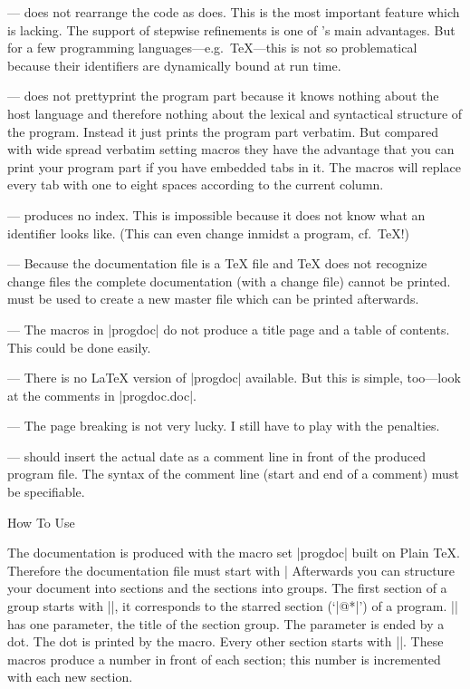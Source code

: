 \item{---} \MAKEPROG{} does not rearrange the code as \TANGLE{} does.
This is the most important feature which is lacking.  The support of
stepwise refinements is one of \WEB{}'s main advantages.  But for a
few programming languages---e.g.\ \TeX{}---this is not so problematical
because their identifiers are dynamically bound at run time.

\item{---} \MAKEPROG{} does not prettyprint the program part because
it knows nothing about the host language and therefore nothing about
the lexical and syntactical structure of the program.  Instead it just
prints the program part verbatim.  But compared with wide spread
verbatim setting macros they have the advantage that you can print
your program part if you have embedded tabs in it.  The macros will
replace every tab with one to eight spaces according to the current
column.

\item{---} \MAKEPROG{} produces no index.  This is impossible because
it does not know what an identifier looks like.  (This can even change
inmidst a program, cf.\ \TeX!)

\item{---} Because the documentation file is a \TeX{} file and \TeX{}
does not recognize change files the complete documentation (with a
change file) cannot be printed.  \TIE{} must be used to create a new
master file which can be printed afterwards.

\item{---} The macros in |progdoc| do not produce a title page and a
table of contents.  This could be done easily.

\item{---} There is no \LaTeX{} version of |progdoc| available.  But
this is simple, too---look at the comments in |progdoc.doc|.

\item{---} The page breaking is not very lucky.  I still have to play
with the penalties.

\item{---} \MAKEPROG{} should insert the actual date as a comment line
in front of the produced program file. The syntax of the comment line
(start and end of a comment) must be specifiable.




\beginsection How To Use \MAKEPROG{}

The documentation is produced with the macro set |progdoc| built on
Plain \TeX{}.  Therefore the documentation file must start with
|  Afterwards you can structure your document into
sections and the sections into groups.  The first section of a group
starts with |\chap|, it corresponds to the starred section (`|@*|') of
a \WEB{} program.  |\chap| has one parameter, the title of the section
group.  The parameter is ended by a dot.  The dot is printed by the
macro.  Every other section starts with |\sect|.  These macros produce
a number in front of each section; this number is incremented with
each new section.

